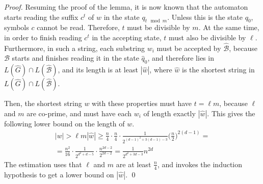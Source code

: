 \documentclass[runningheads]{llncs}
\begin{document}
\begin{proof}
Resuming the proof of the lemma,
it is now known that the automaton starts reading the suffix $c^t$ of $w$
in the state $q_{t \mod m}$.
Unless this is the state $q_0$,
symbols $c$ cannot be read.
Therefore, $t$ must be divisible by $m$.
At the same time, in order to finish reading $c^t$ in the accepting state,
$t$ must also be divisible by $\ell$.
Furthermore, in such a string,
each substring $w_i$ must be accepted by $\widehat{\mathcal{B}}$,
because $\mathcal{B}$ starts and finishes reading it in the state $\widehat{q}_0$,
and therefore lies in $L(\widehat{G}) \cap L(\widehat{\mathcal{B}})$,
and its length is at least $|\widehat{w}|$,
where $\widehat{w}$ is the shortest string in $L(\widehat{G}) \cap L(\widehat{\mathcal{B}})$.

Then, the shortest string $w$ with these properties
must have $t=\ell m$,
because $\ell$ and $m$ are co-prime,
and must have each $w_i$ of length exactly $|\widehat{w}|$.
This gives the following lower bound on the length of $w$.
\begin{multline*}
	|w|
		>
	\ell m |\widehat{w}|
		\geqslant
	\frac{n}{4} \cdot \frac{n}{4} \cdot 
	\frac{1}{2^{(d-1)^2 + 3(d-1) - 3}} \Big(\frac{n}{2}\Big)^{2(d-1)}
		= \\ = %
	\frac{n^2}{16} \cdot 
	\frac{1}{2^{d^2 + d - 5}} \cdot \frac{n^{2d-2}}{2^{2d-2}}
		= %
	\frac{1}{2^{d^2 + 3d -3}} n^{2d}
\end{multline*}
The estimation uses that $\ell$ and $m$ are at least $\frac{n}{4}$,
and invokes the induction hypothesis to get a lower bound on $|\widehat{w}|$.
\qed
\end{proof}
\end{document}
